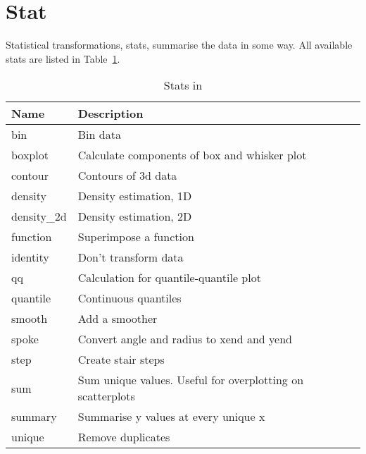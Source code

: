 \section{Stat}
\label{sec:stat}

Statistical transformations, stats, summarise the data in some way.  All available stats are listed in Table~\ref{tbl:stats}. 

\begin{table}
  \begin{center}
  \begin{tabular}{lp{3in}}
    \toprule
    Name & Description \\
    \midrule
    bin          & Bin data                                                   \\
    boxplot      & Calculate components of box and whisker plot               \\
    contour      & Contours of 3d data                                        \\
    density      & Density estimation, 1D                                     \\
    density\_2d & Density estimation, 2D                                     \\
    function     & Superimpose a function                                     \\
    identity     & Don't transform data                                       \\
    qq           & Calculation for quantile-quantile plot                     \\
    quantile     & Continuous quantiles                                       \\
    smooth       & Add a smoother                                             \\
    spoke        & Convert angle and radius to xend and yend                  \\
    step         & Create stair steps                                         \\
    sum          & Sum unique values.  Useful for overplotting on scatterplots\\
    summary      & Summarise y values at every unique x                       \\
    unique       & Remove duplicates                                          \\
    \bottomrule
  \end{tabular}
  \end{center}
  \caption{Stats in \ggplot}
  \label{tbl:stats}
\end{table}

